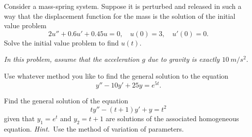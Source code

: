 \documentclass[12pt]{exam}
\begin{document}
\begin{questions}  

\question Consider a mass-spring system. Suppose it is perturbed and released in such a way that the displacement function for the mass is the solution of the initial value problem
\begin{displaymath}
    2u'' + 0.6u' + 0.45 u = 0, \quad u(0) = 3, \quad u'(0) = 0.
\end{displaymath}
Solve the initial value problem to find $u(t)$.


\question
\emph{In this problem, assume that the acceleration $g$ due to gravity is exactly $\SI{10}{m/s^2}$.}



\question Use whatever method you like to find the general solution to the equation
\[
    y'' - 10y' + 25y = e^{5t}.
\]


\question Find the general solution of the equation 
    \[
        ty'' - (t+1)y' + y = t^2
    \]
given that $y_1 = e^t$ and $y_2 = t+1$ are solutions of the associated homogeneous equation. \emph{Hint.}~Use the method of variation of parameters. 


\end{questions}
\end{document}
